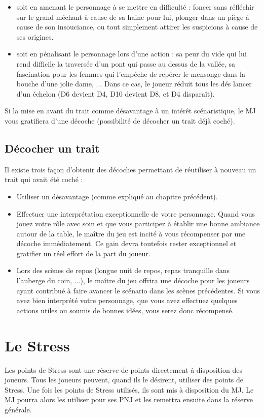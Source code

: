 \documentclass{conf/FusinaClass}
\begin{document}
\begin{itemize}
\item soit en amenant le personnage à se mettre en difficulté : foncer sans réfléchir sur le grand méchant à cause de sa haine pour lui, plonger dans un piège à cause de son insouciance, ou tout simplement attirer les suspicions à cause de ses origines.
\item soit en pénalisant le personnage lors d'une action : sa peur du vide qui lui rend difficile la traversée d'un pont qui passe au dessus de la vallée, sa fascination pour les femmes qui l'empêche de repérer le mensonge dans la bouche d'une jolie dame, ... Dans ce cas, le joueur réduit tous les dés lancer d'un échelon (D6 devient D4, D10 devient D8, et D4 disparaît).
\end{itemize}

Si la mise en avant du trait comme désavantage à un intérêt scénaristique, le MJ vous gratifiera d'une décoche (possibilité de décocher un trait déjà coché). 

\section{Décocher un trait}
Il existe trois façon d'obtenir des décoches permettant de réutiliser à nouveau un trait qui avait été coché :

\begin{itemize}
\item Utiliser un désavantage (comme expliqué au chapitre précédent).
\item Effectuer une interprétation exceptionnelle de votre personnage. Quand vous jouez votre rôle avec soin et que vous participez à établir une bonne ambiance autour de la table, le maître du jeu est incité à vous récompenser par une décoche immédiatement. Ce gain devra toutefois rester exceptionnel et gratifier un réel effort de la part du joueur.
\item Lors des scènes de repos (longue nuit de repos, repas tranquille dans l'auberge du coin, ...), le maître du jeu offrira une décoche pour les joueurs ayant contribué à faire avancer le scénario dans les scènes précédentes. Si vous avez bien interprété votre personnage, que vous avez effectuez quelques actions utiles ou soumis de bonnes idées, vous serez donc récompensé.
\end{itemize}

\chapter{Le Stress}
Les points de Stress sont une réserve de points directement à disposition des joueurs. Tous les joueurs peuvent, quand ils le désirent, utiliser des points de Stress. Une fois les points de Stress utilisés, ils sont mis à disposition du MJ. Le MJ pourra alors les utiliser pour ses PNJ et les remettra ensuite dans la réserve générale.
\end{document}
